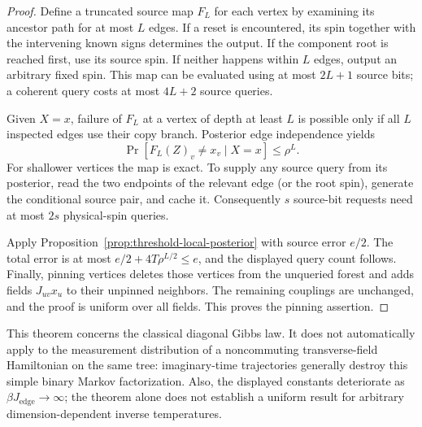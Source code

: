 \begin{proof}
Define a truncated source map \(F_L\) for each vertex by examining
its ancestor path for at most \(L\) edges. If a reset is encountered,
its spin together with the intervening known signs determines the
output. If the component root is reached first, use its source spin.
If neither happens within \(L\) edges, output an arbitrary fixed spin.
This map can be evaluated using at most \(2L+1\) source bits; a
coherent query costs at most \(4L+2\) source queries.

Given \(X=x\), failure of \(F_L\) at a vertex of depth at least
\(L\) is possible only if all \(L\) inspected edges use their copy
branch. Posterior edge independence yields
\[
 \Pr[F_L(Z)_v\ne x_v\mid X=x]\le\rho^L.
\]
For shallower vertices the map is exact. To supply any source query
from its posterior, read the two endpoints of the relevant edge
(or the root spin), generate the conditional source pair, and cache
it. Consequently \(s\) source-bit requests need at most \(2s\)
physical-spin queries.

Apply Proposition~\ref{prop:threshold-local-posterior} with source
error \(e/2\). The total error is at most
\(e/2+4T\rho^{L/2}\le e\), and the displayed query count follows.
Finally, pinning vertices deletes those vertices from the unqueried
forest and adds fields \(J_{uv}x_u\) to their unpinned neighbors.
The remaining couplings are unchanged, and the proof is uniform over
all fields. This proves the pinning assertion.
\end{proof}

This theorem concerns the classical diagonal Gibbs law. It does not
automatically apply to the measurement distribution of a noncommuting
transverse-field Hamiltonian on the same tree: imaginary-time
trajectories generally destroy this simple binary Markov
factorization. Also, the displayed constants deteriorate as
\(\beta J_{\mathrm{edge}}\to\infty\); the theorem alone does not establish a
uniform result for arbitrary dimension-dependent inverse temperatures.
